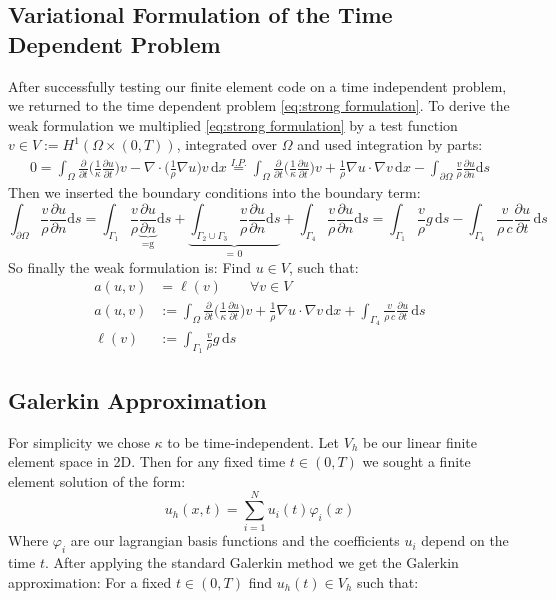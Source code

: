 \documentclass{article}
\begin{document}
\subsection{Variational Formulation of the Time Dependent Problem}
After successfully testing our finite element code on a time independent problem, we returned to the time dependent problem \hyperref[eq:strong formulation]{\eqref{eq:strong formulation}}.
To derive the weak formulation we multiplied \hyperref[eq:strong formulation]{\eqref{eq:strong formulation}} by a test function $v\in V := H^1(\Omega \times (0,T))$, integrated over $\Omega$ and used integration by parts:
\begin{align*}
	0 = \int_{\Omega} \frac{\partial}{\partial t}\Big(\frac{1}{\kappa}\frac{\partial u}			{\partial t}\Big)v - \nabla \cdot \Big(\frac{1}{\rho}\nabla u\Big)v\,\text{d}x 					\overset{I.P.}{=}
	\int_{\Omega} \frac{\partial}{\partial t}\Big(\frac{1}{\kappa}								\frac{\partial u}{\partial t}\Big)v + \frac{1}{\rho}\nabla u \cdot \nabla v \, \text{d}x
	- \int_{\partial \Omega} \frac{v}{\rho} \frac{\partial u}{\partial n} \text{d}s
\end{align*}
Then we inserted the boundary conditions into the boundary term:
\[
	\int_{\partial \Omega} \frac{v}{\rho} \frac{\partial u}{\partial n} \text{d}s
	= \int_{\Gamma_1} \frac{v}{\rho} \underbrace{\frac{\partial u}{\partial n}}_{\text{=g}} \text{d}s + 
	\underbrace{\int_{\Gamma_2 \cup \Gamma_3} \frac{v}{\rho} \frac{\partial u}{\partial n} \text{d}s}_{\text{= 0} } + 
	\int_{\Gamma_4} \frac{v}{\rho} \frac{\partial u}{\partial n} \text{d}s
	= \int_{\Gamma_1} \frac{v}{\rho} g\, \text{d}s - 
	\int_{\Gamma_4}\frac{v}{\rho\, c} \frac{\partial u}{\partial t} \, \text{d}s
\]
So finally the weak formulation is: Find $u \in V$, such that:
\begin{equation}\label{eq:weak formulation}
	\begin{aligned}
	a(u,v) &= \ell(v)\qquad  \forall v\in V \\
	a(u,v) &:= \int_{\Omega} \frac{\partial}{\partial t}\Big(\frac{1}{\kappa}
	\frac{\partial u}{\partial t}\Big)v + \frac{1}{\rho}\nabla u \cdot \nabla v \, \text{d}x +
	\int_{\Gamma_4}\frac{v}{\rho\, c} \frac{\partial u}{\partial t} \, \text{d}s\\
	\ell(v) &:= \int_{\Gamma_1} \frac{v}{\rho} g\, \text{d}s 
	\end{aligned}
\end{equation}

\subsection{Galerkin Approximation}
For simplicity we chose $\kappa$ to be time-independent. Let $V_h$ be our linear finite element space in 2D. Then for any fixed time $t \in (0,T)$ we sought a finite element solution of the form: 
\[
	u_h(x,t) = \sum_{i=1}^N u_i(t) \varphi_i(x)
\]
Where $\varphi_i$ are our lagrangian basis functions and the coefficients $u_i$ depend on the time $t$. After applying the standard Galerkin method we get the Galerkin approximation: For a fixed $t\in (0,T)$ find $u_h(t) \in V_h$ such that: 
\end{document}

